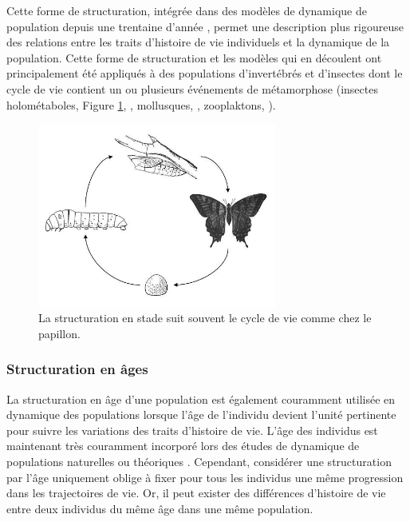 Cette forme de structuration, intégrée dans des modèles de dynamique de
population depuis une trentaine d'année \autocites{gurney1983a,nisbet1983a},
permet une description plus rigoureuse des relations entre les traits
d'histoire de vie individuels et la dynamique de la population. Cette forme de
structuration et les modèles qui en découlent \autocites{nisbet1989a} ont
principalement été appliqués à des populations d'invertébrés et d'insectes dont le cycle de vie contient un ou
plusieurs événements de métamorphose (insectes holométaboles, Figure
\ref{fig:stade}, \citealp{barclay1980model,gurney1980a,nisbet1983a}, mollusques,
\citealp{taris2006phenotypic}, zooplaktons, \citealp{mccauley1996a}).

\begin{figure}[H]
\centering
\includegraphics[width=0.7\textwidth]{1_CorpsDeThese/EA/Fig/stage}
\caption[structuration en stade]{La structuration en stade suit souvent le
cycle de vie comme chez le papillon.}\label{fig:stade}
\end{figure}

\subsubsection{Structuration en âges}

La structuration en âge d'une population est également couramment utilisée en
dynamique des populations lorsque l'âge de l'individu devient l'unité pertinente
pour suivre les variations des traits d'histoire de vie. L'âge des individus est
maintenant très couramment incorporé lors des études de dynamique de populations
naturelles ou théoriques
\autocite[par ex.
][]{coulson2008a,marteinsdottir2002a,worden2010a,robinson2013a}.
Cependant, considérer une structuration par l'âge uniquement oblige à fixer pour
tous les individus une même progression dans les trajectoires de vie. Or, il
peut exister des différences d'histoire de vie entre deux individus du même âge
dans une même population.

